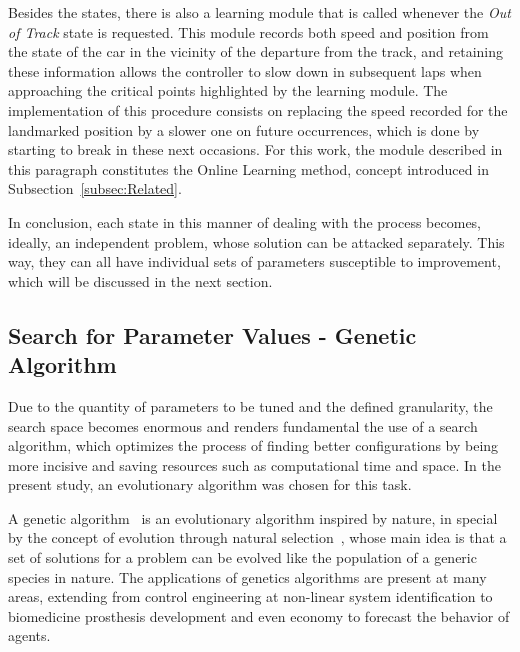 	Besides the states, there is also a learning module that is called whenever the \emph{Out of Track} state is
	requested. This module records both speed and position from the state of the car in the vicinity of the departure
	from the track, and retaining these information allows the controller to slow down in subsequent laps when
	approaching the critical points highlighted by the learning module. The implementation of this procedure consists
	on replacing the speed recorded for the landmarked position by a slower one on future occurrences, which is done
	by starting to break in these next occasions. For this work, the module described in this paragraph constitutes
	the Online Learning method, concept introduced in Subsection~\ref{subsec:Related}.
	
	In conclusion, each state in this manner of dealing with the process becomes, ideally, an independent problem,
	whose solution can be attacked separately. This way, they can all have individual sets of parameters susceptible
	to improvement, which will be discussed in the next section.
	
\subsection{Search for Parameter Values - Genetic Algorithm} \label{subsec:GA}
	
	Due to the quantity of parameters to be tuned and the defined granularity, the search space becomes enormous and
	renders fundamental the use of a search algorithm, which optimizes the process of finding better configurations
	by being more incisive and saving resources such as computational time and space. In the present study, an
	evolutionary algorithm was chosen for this task.
	
	A genetic algorithm~\cite{GA} is an evolutionary algorithm inspired by nature, in special by the concept of
	evolution through natural selection~\cite{Darwin}, whose main idea is that a set of solutions for a problem can
	be evolved like the population of a generic species in nature. The applications of genetics algorithms are
	present at many areas, extending from control engineering at non-linear system identification to biomedicine
	prosthesis development and even economy to forecast the behavior of agents.
	

